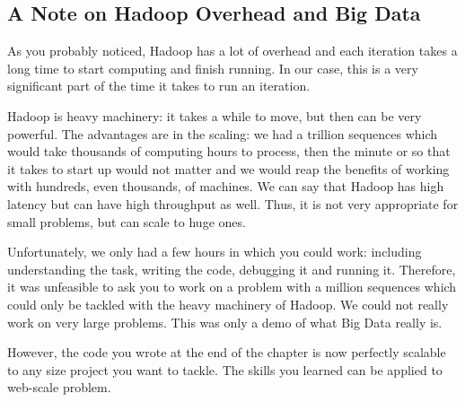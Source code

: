 \subsection{A Note on Hadoop Overhead and Big Data}

As you probably noticed, Hadoop has a lot of overhead and each iteration takes
a long time to start computing and finish running. In our case, this is a very
significant part of the time it takes to run an iteration.

Hadoop is heavy machinery: it takes a while to move, but then can be very
powerful. The advantages are in the scaling: we had a trillion sequences which
would take thousands of computing hours to process, then the minute or so that
it takes to start up would not matter and we would reap the benefits of working
with hundreds, even thousands, of machines. We can say that Hadoop has high
latency but can have high throughput as well. Thus, it is not very appropriate
for small problems, but can scale to huge ones.

Unfortunately, we only had a few hours in which you could work: including
understanding the task, writing the code, debugging it and running it.
Therefore, it was unfeasible to ask you to work on a problem with a million
sequences which could only be tackled with the heavy machinery of Hadoop.
We could not really work on very large problems. This was only a demo of what
Big Data really is.

However, the code you wrote at the end of the chapter is now perfectly scalable
to any size project you want to tackle. The skills you learned can be applied
to web-scale problem.

